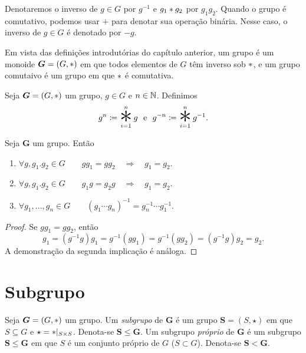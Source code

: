 \begin{nota}
	Denotaremos o inverso de $g \in G$ por $g^{-1}$ e $g_1 \ast g_2$ por $g_1g_2$. Quando o grupo é comutativo, podemos usar $+$ para denotar sua operação binária. Nesse caso, o inverso de $g \in G$ é denotado por $-g$.
\end{nota}

Em vista das definições introdutórias do capítulo anterior, um grupo é um monoide $\bm G=(G,\ast)$ em que todos elementos de $G$ têm inverso sob $\ast$, e um grupo comutaivo é um grupo em que $\ast$ é comutativa.

\begin{defi}
Seja $\bm G=(G,\ast)$ um grupo, $g \in G$ e $n \in \mathbb{N}$. Definimos
	\begin{equation*}
	g^n \coloneqq \bigopb_{i=1}^n g \e g^{-n} \coloneqq \bigopb_{i=1}^n g^{-1}.
	\end{equation*}
\end{defi}

\begin{prop}
	Seja $\bm G$ um grupo. Então
	\begin{enumerate}
	\item $\forall g,g_1.g_2 \in G \qquad gg_1 = gg_2 \quad \Rightarrow \quad g_1 = g_2$.
	\item $\forall g,g_1.g_2 \in G \qquad g_1g = g_2g \quad \Rightarrow \quad g_1 = g_2$.
	\item $\forall g_1,\ldots,g_n \in G \qquad (g_1 \cdots g_n)^{-1}=g_n^{-1} \cdots g_1^{-1}.$
	\end{enumerate}
\end{prop}
\begin{proof}
	Se $g g_1 = g g_2$, então
	\begin{equation*}
	g_1 = (g^{-1}g)g_1 = g^{-1}(gg_1) = g^{-1}(gg_2) = (g^{-1}g)g_2 = g_2.
	\end{equation*}
A demonstração da segunda implicação é análoga.
\end{proof}

\section{Subgrupo}

\begin{defi}
Seja $\bm G=(G,\ast)$ um grupo. Um \emph{subgrupo} de $\bm G$ é um grupo $\bm S=(S,\star)$ em que $S \subseteq G$ e $\star=\ast|_{S \times S}$. Denota-se $\bm S \leq \bm G$. Um subgrupo \emph{próprio} de $\bm G$ é um subgrupo $\bm S \leq \bm G$ em que $S$ é um conjunto próprio de $G$ ($S  \subset G$). Denota-se $\bm S < \bm G$.
\end{defi}

